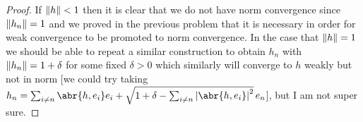 \documentclass[11pt]{article}
\begin{document}
\begin{enumerate}
\begin{proof}
      If $\norm{h}<1$ then it is clear that we do not have norm convergence since $\norm{h_n}=1$ and we proved in the previous problem that it is necessary in order for weak convergence to be promoted to norm convergence. In the case that $\norm{h} = 1$ we should be able to repeat a similar construction to obtain $h_n$ with $\norm{h_n}=1+\delta$ for some fixed $\delta>0$ which similarly will converge to $h$ weakly but not in norm [we could try taking $h_n = \sum_{i\neq n}\abr{h,e_i}e_i + \sqrt{1+\delta-\sum_{i\neq n}\abs{\abr{h,e_i}}^2}\,e_n$], but I am not super sure. 
    \end{proof}
\end{enumerate}
\end{document}
